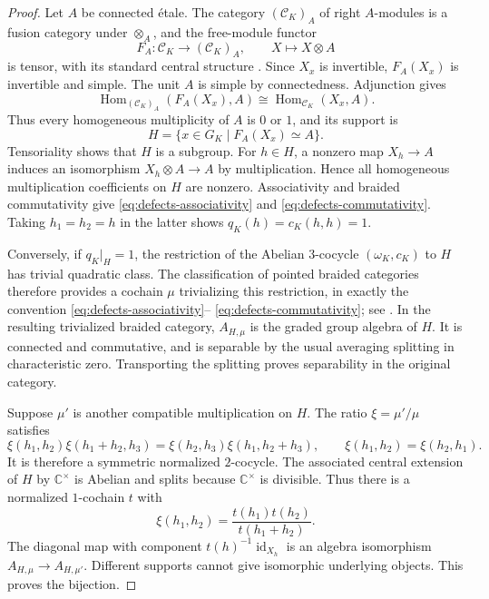 \documentclass[12pt]{amsart}
\numberwithin{equation}{section}
\theoremstyle{definition}
\DeclareMathOperator{\Hom}{Hom}
\DeclareMathOperator{\id}{id}
\begin{document}
\begin{proof}
Let $A$ be connected \'etale. The category $(\mathcal C_K)_A$
of right $A$-modules is a fusion category under $\otimes_A$, and
the free-module functor
$$
F_A:\mathcal C_K\to(\mathcal C_K)_A,\qquad X\mapsto X\otimes A
$$
is tensor, with its standard central structure
\cite[Section~3]{DMNO2013}. Since $X_x$ is invertible, $F_A(X_x)$
is invertible and simple. The unit $A$ is simple by connectedness.
Adjunction gives
$$
\Hom_{(\mathcal C_K)_A}(F_A(X_x),A)
\cong\Hom_{\mathcal C_K}(X_x,A).
$$
Thus every homogeneous multiplicity of $A$ is $0$ or $1$, and
its support is
$$
H=\{x\in G_K\mid F_A(X_x)\simeq A\}.
$$
Tensoriality shows that $H$ is a subgroup. For $h\in H$, a nonzero
map $X_h\to A$ induces an isomorphism $X_h\otimes A\to A$ by
multiplication. Hence all homogeneous multiplication coefficients
on $H$ are nonzero. Associativity and braided commutativity give
\eqref{eq:defects-associativity} and
\eqref{eq:defects-commutativity}. Taking $h_1=h_2=h$ in the latter
shows $q_K(h)=c_K(h,h)=1$.

Conversely, if $q_K|_H=1$, the restriction of the Abelian
$3$-cocycle $(\omega_K,c_K)$ to $H$ has trivial quadratic class.
The classification of pointed braided categories therefore
provides a cochain $\mu$ trivializing this restriction, in exactly
the convention \eqref{eq:defects-associativity}--
\eqref{eq:defects-commutativity}; see \cite{Joyal-Street,DGNO2010}.
In the resulting trivialized braided category, $A_{H,\mu}$ is
the graded group algebra of $H$. It is connected and commutative,
and is separable by the usual averaging splitting in characteristic
zero. Transporting the splitting proves separability in the original
category.

Suppose $\mu'$ is another compatible multiplication on $H$.
The ratio $\xi=\mu'/\mu$ satisfies
$$
\xi(h_1,h_2)\xi(h_1+h_2,h_3)
=\xi(h_2,h_3)\xi(h_1,h_2+h_3),\qquad
\xi(h_1,h_2)=\xi(h_2,h_1).
$$
It is therefore a symmetric normalized $2$-cocycle. The associated
central extension of $H$ by $\mathbb C^\times$ is Abelian and
splits because $\mathbb C^\times$ is divisible. Thus there is a
normalized $1$-cochain $t$ with
$$
\xi(h_1,h_2)=\frac{t(h_1)t(h_2)}{t(h_1+h_2)}.
$$
The diagonal map with component $t(h)^{-1}\id_{X_h}$ is an algebra
isomorphism $A_{H,\mu}\to A_{H,\mu'}$. Different supports cannot
give isomorphic underlying objects. This proves the bijection.


\end{proof}
\end{document}
